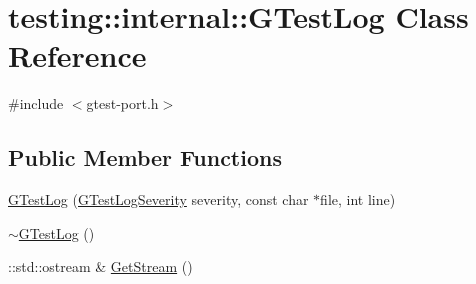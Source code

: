 \hypertarget{classtesting_1_1internal_1_1_g_test_log}{\section{testing\+:\+:internal\+:\+:G\+Test\+Log Class Reference}
\label{classtesting_1_1internal_1_1_g_test_log}
}


{\ttfamily \#include $<$gtest-\/port.\+h$>$}

\subsection*{Public Member Functions}
\begin{DoxyCompactItemize}
\item 
\hyperlink{classtesting_1_1internal_1_1_g_test_log_a364691bf972983a59cfa2891062a64af}{G\+Test\+Log} (\hyperlink{namespacetesting_1_1internal_aa6255ef3b023c5b4e1a2198d887fb977}{G\+Test\+Log\+Severity} severity, const char $\ast$file, int line)
\item 
\hyperlink{classtesting_1_1internal_1_1_g_test_log_a978a099703bbaa0f380216e8d7ee03d3}{$\sim$\+G\+Test\+Log} ()
\item 
\+::std\+::ostream \& \hyperlink{classtesting_1_1internal_1_1_g_test_log_aebb92e67d98eca69f0347d5121dab27a}{Get\+Stream} ()
\end{DoxyCompactItemize}


